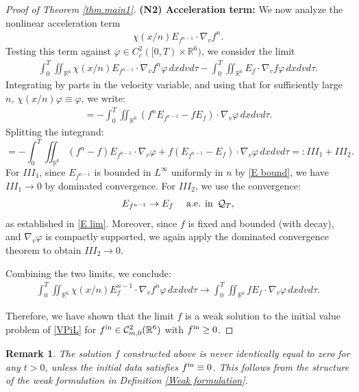 \documentclass[reqno,11pt,final]{amsart}
\theoremstyle{plain}
\newtheorem{remark}[theorem]{Remark}
\numberwithin{equation}{section}
\numberwithin{theorem}{section}
\begin{document}
\begin{proof}[Proof of Theorem \ref{thm.main1}]
\noindent\textbf{(N2) Acceleration term:} We now analyze the nonlinear acceleration term
\begin{align*}
\chi(x/n)E_{f^{n-1}} \cdot\nabla_vf^n.
\end{align*}Testing this term against $\varphi\in C_c^2([0,T)\times\mathbb{R}^6)$, we consider the limit
\begin{align*}
\int_0^T\iint_{\mathbb{R}^6} \chi(x/n)E_{f^{n-1}}\cdot\nabla_vf^n \varphi\,dxdvd\tau- \int_0^T\iint_{\mathbb{R}^6} E_f\cdot\nabla_vf \varphi\,dxdvd\tau.
\end{align*}Integrating by parts in the velocity variable, and using that for sufficiently large $n$, $\chi(x/n)\varphi \equiv \varphi$, we write:
\begin{align*}
= -\int_0^T \iint_{\mathbb{R}^6} (f^n E_{f^{n-1}} - fE_f)\cdot\nabla_v\varphi\,dxdvd\tau.
\end{align*}Splitting the integrand:
\begin{equation*}
= -\int_0^T \iint_{\mathbb{R}^6} (f^n - f)E_{f^{n-1}}\cdot\nabla_v\varphi + f(E_{f^{n-1}} - E_f)\cdot\nabla_v\varphi\,dxdvd\tau=:\textit{III}_1 + \textit{III}_2.
\end{equation*}For $\textit{III}_1$, since $E_{f^{n-1}}$ is bounded in $L^\infty$ uniformly in $n$ by \eqref{E bound}, we have $\textit{III}_1 \to0$ by dominated convergence. For $\textit{III}_2$, we use the convergence:
\begin{align*}
E_{f^{n-1}}\to E_f \quad \textup{ a.e. in }\,\mathcal{Q}_T,
\end{align*}as established in \eqref{E lim}. Moreover, since $f$ is fixed and bounded (with decay), and $\nabla_v\varphi$ is compactly supported, we again apply the dominated convergence theorem to obtain $\textit{III}_2\to0$.

Combining the two limits, we conclude:
\begin{align*}
\int_0^T\iint_{\mathbb{R}^6} \chi(x/n)E_f^{n-1}\cdot\nabla_vf^n \varphi\,dxdvd\tau \to \int_0^T\iint_{\mathbb{R}^6} fE_f\cdot\nabla_v\varphi\,dxdvd\tau.
\end{align*}

Therefore, we have shown that the limit $f$ is a weak solution to the initial value problem of \eqref{VPiL} for $f^\textup{in}\in \mathcal{C}^2_{m,0}(\mathbb{R}^6)$ with $f^\textup{in}\ge0$.\end{proof}


\begin{remark}The solution $f$ constructed above is never identically equal to zero for any $t>0$, unless the initial data satisfies $f^\textup{in}\equiv0$. This follows from the structure of the weak formulation in Definition \ref{Weak formulation}.
\end{remark}
\end{document}
